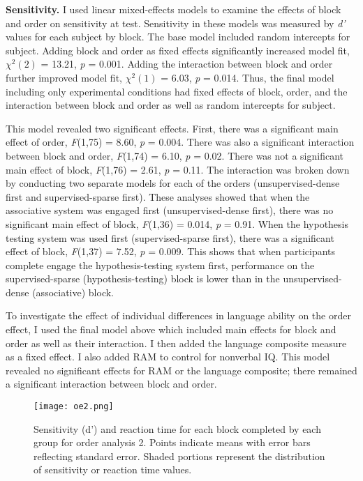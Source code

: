 \documentclass[../dissertation.tex]{subfiles}
\begin{document}
	\textbf{Sensitivity.} I used linear mixed-effects models to examine the effects of block and order on sensitivity at test. Sensitivity in these models was measured by \textit{d'} values for each subject by block. The base model included random intercepts for subject. Adding block and order as fixed effects significantly increased model fit, $\chi^{2}(2)$ = 13.21,  \textit{p} = 0.001. Adding the interaction between block and order further improved model fit, $\chi^{2}(1)$ = 6.03,  \textit{p} = 0.014. Thus, the final model including only experimental conditions had fixed effects of block, order, and the interaction between block and order as well as random intercepts for subject. \par
	This model revealed two significant effects. First, there was a significant main effect of order, \textit{F}(1,75) = 8.60, \textit{p} = 0.004. There was also a significant interaction between block and order, \textit{F}(1,74) = 6.10, \textit{p} = 0.02. There was not a significant main effect of block, \textit{F}(1,76) = 2.61, \textit{p} = 0.11. The interaction was broken down by conducting two separate models for each of the orders (unsupervised-dense first and supervised-sparse first). These analyses showed that when the associative system was engaged first (unsupervised-dense first), there was no significant main effect of block, \textit{F}(1,36) = 0.014, \textit{p} = 0.91. When the hypothesis testing system was used first (supervised-sparse first), there was a significant effect of block, \textit{F}(1,37) = 7.52, \textit{p} = 0.009. This shows that when participants complete engage the hypothesis-testing system first, performance on the supervised-sparse (hypothesis-testing) block is lower than in the unsupervised-dense (associative) block. \par
	To investigate the effect of individual differences in language ability on the order effect, I used the final model above which included main effects for block and order as well as their interaction. I then added  the language composite measure as a fixed effect. I also added RAM to control for nonverbal IQ. This model revealed no significant effects for RAM or the language composite; there remained a significant interaction between block and order. \par
	
\begin{wrapfigure}{R}{0.55\textwidth}
\vspace{-10pt}
\texttt{[image: oe2.png]}
\caption[Sensitivity and reaction time for order analysis 2]{Sensitivity (d')  and reaction time for each block completed by each group for order analysis 2. Points indicate means with error bars reflecting standard error. Shaded portions represent the distribution of sensitivity or reaction time values.}
\label{oe2}
\vspace{-20pt}
\end{wrapfigure}	
\end{document}
